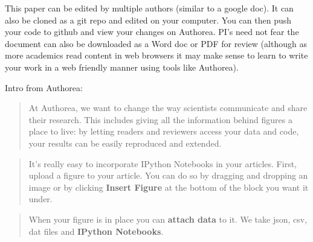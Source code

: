 This paper can be edited by multiple authors (similar to a google doc). It can also be cloned as a git repo and edited on your computer. You can then push your code to github and view your changes on Authorea. PI's need not fear the document can also be downloaded as a Word doc or PDF for review (although as more academics read content in web browsers it may make sense to learn to write your work in a web friendly manner using tools like Authorea).


Intro from Authorea: 
\begin{quote}
At Authorea, we want to change the way scientists communicate and share their research. This includes giving all the information behind figures a place to live: by letting readers and reviewers access your data and code, your results can be easily reproduced and extended.
\end{quote}

\begin{quote}
It's really easy to incorporate IPython Notebooks in your articles.  First, upload a figure to your article. You can do so by dragging and dropping an image or by clicking \textbf{Insert Figure} at the bottom of the block you want it under.  
\end{quote}

\begin{quote}
When your figure is in place you can \textbf{attach data} to it. We take json, csv, dat files and \textbf{IPython Notebooks}. 
\end{quote}